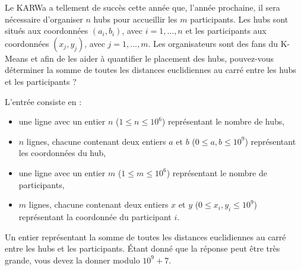 \problemname{\problemyamlname}


Le KARWa a tellement de succès cette année que, l'année prochaine, il sera nécessaire d'organiser $n$ hubs pour
accueillir les $m$ participants. Les hubs sont situés aux coordonnées $(a_i , b_i )$, avec $i = 1, ..., n$ et les participants aux coordonnées $(x_j , y_j )$, avec $j = 1, ..., m$.
Les organisateurs sont des fans du K-Means et afin de les aider à quantifier le placement des hubs, pouvez-vous
déterminer la somme de toutes les distances euclidiennes au carré entre les hubs et les participants ?
\begin{Input}
    L'entrée consiste en :
    \begin{itemize}
      \item une ligne avec un entier $n$ ($1 \leq n \leq 10^{6}$) représentant le nombre de hubs,
      \item $n$ lignes, chacune contenant deux entiers $a$ et $b$ ($0 \leq a, b\leq 10^{9}$) représentant les coordonnées du hub,
      \item une ligne avec un entier $m$ ($1 \leq m \leq 10^{6}$)  représentant le nombre de participants,
      \item $m$ lignes, chacune contenant deux entiers $x$ et $y$ ($0 \leq x_i, y_i\leq 10^{9}$) représentant la coordonnée du participant $i$.
    \end{itemize}
\end{Input}

\begin{Output}
Un entier représentant la somme de toutes les distances euclidiennes au carré entre les hubs et les participants. Étant donné que la réponse peut être très grande, vous devez la donner modulo $10^9 + 7$.
\end{Output}
